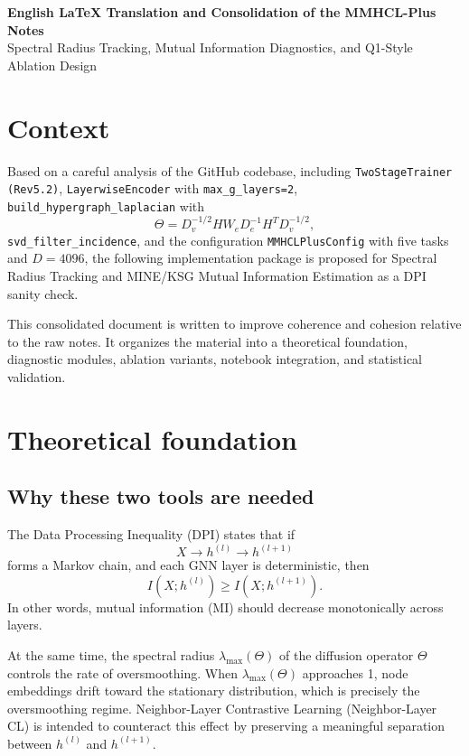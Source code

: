 \documentclass[11pt,a4paper]{article}
\begin{document}
\begin{center}
{\LARGE \textbf{English LaTeX Translation and Consolidation of the MMHCL-Plus Notes}}\\[0.5em]
{\large Spectral Radius Tracking, Mutual Information Diagnostics, and Q1-Style Ablation Design}
\end{center}

\section{Context}
Based on a careful analysis of the GitHub codebase, including \texttt{TwoStageTrainer (Rev5.2)}, \texttt{LayerwiseEncoder} with \texttt{max\_g\_layers=2}, \texttt{build\_hypergraph\_laplacian} with
\[
\Theta = D_v^{-1/2} H W_e D_e^{-1} H^T D_v^{-1/2},
\]
\texttt{svd\_filter\_incidence}, and the configuration \texttt{MMHCLPlusConfig} with five tasks and \(D = 4096\), the following implementation package is proposed for Spectral Radius Tracking and MINE/KSG Mutual Information Estimation as a DPI sanity check.

This consolidated document is written to improve coherence and cohesion relative to the raw notes. It organizes the material into a theoretical foundation, diagnostic modules, ablation variants, notebook integration, and statistical validation.

\section{Theoretical foundation}
\subsection{Why these two tools are needed}
The Data Processing Inequality (DPI) states that if
\[
X \rightarrow h^{(l)} \rightarrow h^{(l+1)}
\]
forms a Markov chain, and each GNN layer is deterministic, then
\[
I(X; h^{(l)}) \ge I(X; h^{(l+1)}).
\]
In other words, mutual information (MI) should decrease monotonically across layers.

At the same time, the spectral radius \(\lambda_{\max}(\Theta)\) of the diffusion operator \(\Theta\) controls the rate of oversmoothing. When \(\lambda_{\max}(\Theta)\) approaches 1, node embeddings drift toward the stationary distribution, which is precisely the oversmoothing regime. Neighbor-Layer Contrastive Learning (Neighbor-Layer CL) is intended to counteract this effect by preserving a meaningful separation between \(h^{(l)}\) and \(h^{(l+1)}\).
\end{document}
